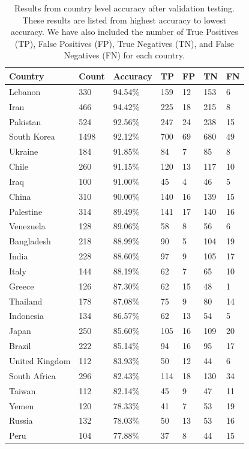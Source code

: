 \begin{table}
\centering
\begin{tabular}{|l|l|l|l|l|l|l|}
\hline
\textbf{Country} & \textbf{Count}& \textbf{Accuracy} & \textbf{TP} & \textbf{FP} & \textbf{TN} & \textbf{FN} \\ \hline
Lebanon        & 330  & 94.54\% & 159 & 12 & 153 & 6  \\ \hline
Iran           & 466  & 94.42\% & 225 & 18 & 215 & 8  \\ \hline
Pakistan       & 524  & 92.56\% & 247 & 24 & 238 & 15 \\ \hline
South Korea    & 1498 & 92.12\% & 700 & 69 & 680 & 49 \\ \hline
Ukraine        & 184  & 91.85\% & 84  & 7  & 85  & 8  \\ \hline
Chile          & 260  & 91.15\% & 120 & 13 & 117 & 10 \\ \hline
Iraq           & 100  & 91.00\% & 45  & 4  & 46  & 5  \\ \hline
China          & 310  & 90.00\% & 140 & 16 & 139 & 15 \\ \hline
Palestine      & 314  & 89.49\% & 141 & 17 & 140 & 16 \\ \hline
Venezuela      & 128  & 89.06\% & 58  & 8  & 56  & 6  \\ \hline
Bangladesh     & 218  & 88.99\% & 90  & 5  & 104 & 19 \\ \hline
India          & 228  & 88.60\% & 97  & 9  & 105 & 17 \\ \hline
Italy          & 144  & 88.19\% & 62  & 7  & 65  & 10 \\ \hline
Greece         & 126  & 87.30\% & 62  & 15 & 48  & 1  \\ \hline
Thailand       & 178  & 87.08\% & 75  & 9  & 80  & 14 \\ \hline
Indonesia      & 134  & 86.57\% & 62  & 13 & 54  & 5  \\ \hline
Japan          & 250  & 85.60\% & 105 & 16 & 109 & 20 \\ \hline
Brazil         & 222  & 85.14\% & 94  & 16 & 95  & 17 \\ \hline
United Kingdom & 112  & 83.93\% & 50  & 12 & 44  & 6  \\ \hline
South Africa   & 296  & 82.43\% & 114 & 18 & 130 & 34 \\ \hline
Taiwan         & 112  & 82.14\% & 45  & 9  & 47  & 11 \\ \hline
Yemen          & 120  & 78.33\% & 41  & 7  & 53  & 19 \\ \hline
Russia         & 132  & 78.03\% & 50  & 13 & 53  & 16 \\ \hline
Peru           & 104  & 77.88\% & 37  & 8  & 44  & 15 \\ \hline
\end{tabular}
    \caption{Results from country level accuracy after validation testing.  These results are listed from highest accuracy to lowest accuracy.  We have also included the number of True Positives (TP), False Positives (FP), True Negatives (TN), and False Negatives (FN) for each country. }
    \label{tab:validation_country_results}
\end{table}

